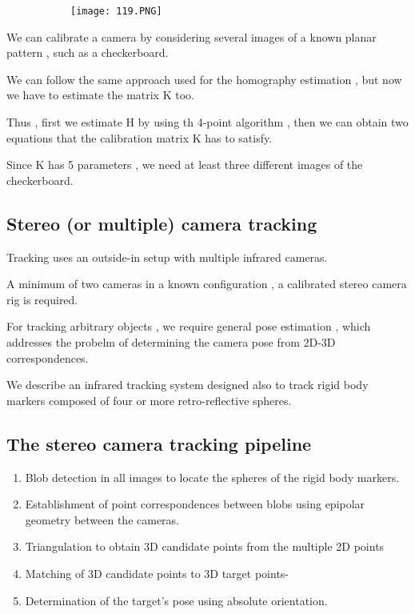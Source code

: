 \documentclass{article}
\begin{document}
\begin{figure}[ht!]
  \centering
  \begin{subfigure}[b]{0.4\linewidth}
    \texttt{[image: 119.PNG]}
  \end{subfigure}
\end{figure}

We can calibrate a camera by considering several images of a known planar pattern , such as a checkerboard.

We can follow the same approach used for the homography estimation , but now we have to estimate the matrix K too.

Thus , first we estimate H by using th 4-point algorithm , then we can obtain two equations that the calibration matrix K has to satisfy.

Since K  has 5 parameters , we need at least three different images of the checkerboard.

\subsection{Stereo (or multiple) camera tracking}

Tracking uses an outside-in setup with multiple infrared cameras.

A minimum of two cameras in a known configuration , a calibrated stereo camera rig is required.

For tracking arbitrary objects , we require general pose estimation , which addresses the probelm of determining the camera pose from 2D-3D correspondences.

We describe an infrared tracking system designed also to track rigid body markers composed of four or more retro-reflective spheres.

\subsection{The stereo camera tracking pipeline}

\begin{enumerate}
    \item Blob detection in all images to locate the spheres of the rigid body markers.
    \item Establishment of point correspondences between blobs using epipolar geometry between the cameras.
    \item Triangulation to obtain 3D candidate points from the multiple 2D points
    \item Matching of 3D candidate points to 3D target points-
    \item Determination of the target's pose using absolute orientation.
\end{enumerate}
\end{document}
